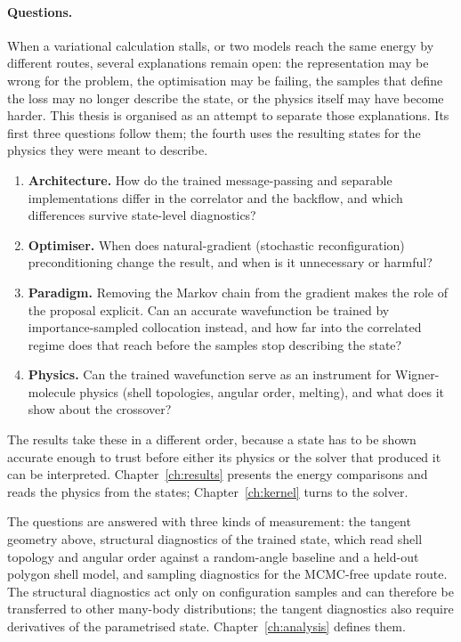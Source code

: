 \paragraph{Questions.}
\label{sec:research-questions}
When a variational calculation stalls, or two models reach the same energy by different
routes, several explanations remain open: the representation may be wrong for the problem,
the optimisation may be failing, the samples that define the loss may no longer describe
the state, or the physics itself may have become harder. This thesis is organised as an
attempt to separate those explanations. Its first three questions follow them; the fourth
uses the resulting states for the physics they were meant to describe.
\begin{enumerate}
  \item \textbf{Architecture.} How do the trained message-passing and separable
        implementations differ in the correlator and the backflow, and which differences
        survive state-level diagnostics?
  \item \textbf{Optimiser.} When does natural-gradient (stochastic reconfiguration)
        preconditioning change the result, and when is it unnecessary or harmful?
  \item \textbf{Paradigm.} Removing the Markov chain from the gradient makes the role of
        the proposal explicit. Can an accurate wavefunction be trained by importance-sampled
        collocation instead, and how far into the correlated regime does that reach before
        the samples stop describing the state?
  \item \textbf{Physics.} Can the trained wavefunction serve as an instrument for
        Wigner-molecule physics (shell topologies, angular order, melting), and what does
        it show about the crossover?
\end{enumerate}

\noindent The results take these in a different order, because a state has to be shown
accurate enough to trust before either its physics or the solver that produced it can be
interpreted. Chapter~\ref{ch:results} presents the energy comparisons and reads the physics from
the states; Chapter~\ref{ch:kernel} turns to the solver.

The questions are answered with three kinds of measurement: the tangent geometry above,
structural diagnostics of the trained state, which read shell topology and angular order
against a random-angle baseline and a held-out polygon shell model, and sampling
diagnostics for the MCMC-free update route. The structural diagnostics act only on
configuration samples and can therefore be transferred to other many-body distributions;
the tangent diagnostics also require derivatives of the parametrised state.
Chapter~\ref{ch:analysis} defines them.

